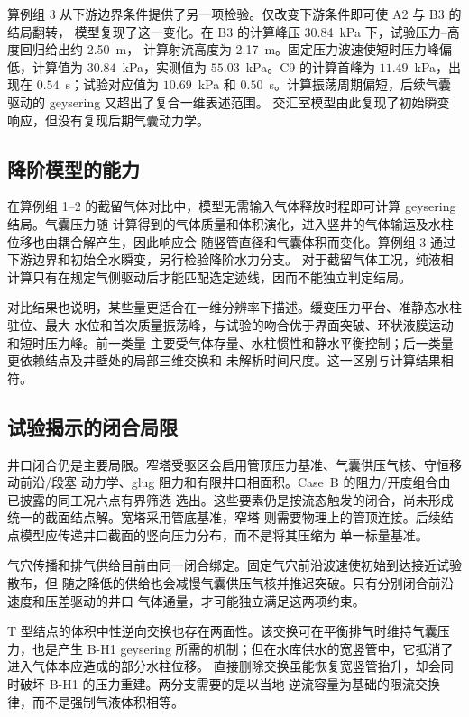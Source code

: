 算例组 3 从下游边界条件提供了另一项检验。仅改变下游条件即可使 A2 与 B3 的结局翻转，
模型复现了这一变化。在 B3 的计算峰压 30.84~kPa 下，试验压力--高度回归给出约 2.50~m，
计算射流高度为 2.17~m。固定压力波速使短时压力峰偏低，计算值为 $30.84$~kPa，实测值为
$55.03$~kPa。C9 的计算首峰为 $11.49$~kPa，出现在 $0.54$~s；试验对应值为
$10.69$~kPa 和 $0.50$~s。计算振荡周期偏短，后续气囊驱动的 geysering 又超出了复合一维表述范围。
交汇室模型由此复现了初始瞬变响应，但没有复现后期气囊动力学。

\subsection{降阶模型的能力}

在算例组 1--2 的截留气体对比中，模型无需输入气体释放时程即可计算 geysering 结局。气囊压力随
计算得到的气体质量和体积演化，进入竖井的气体输运及水柱位移也由耦合解产生，因此响应会
随竖管直径和气囊体积而变化。算例组 3 通过下游边界和初始全水瞬变，另行检验降阶水力分支。
对于截留气体工况，纯液相计算只有在规定气侧驱动后才能匹配选定迹线，因而不能独立判定结局。

对比结果也说明，某些量更适合在一维分辨率下描述。缓变压力平台、准静态水柱驻位、最大
水位和首次质量振荡峰，与试验的吻合优于界面突破、环状液膜运动和短时压力峰。前一类量
主要受气体存量、水柱惯性和静水平衡控制；后一类量更依赖结点及井壁处的局部三维交换和
未解析时间尺度。这一区别与计算结果相符。

\subsection{试验揭示的闭合局限}

井口闭合仍是主要局限。窄塔受驱区会启用管顶压力基准、气囊供压气核、守恒移动前沿/段塞
动力学、glug 阻力和有限井口相面积。Case~B 的阻力/开度组合由已披露的同工况六点有界筛选
选出。这些要素仍是按流态触发的闭合，尚未形成统一的截面结点解。宽塔采用管底基准，窄塔
则需要物理上的管顶连接。后续结点模型应传递井口截面的竖向压力分布，而不是将其压缩为
单一标量基准。

气穴传播和排气供给目前由同一闭合绑定。固定气穴前沿波速使初始到达接近试验散布，但
随之降低的供给也会减慢气囊供压气核并推迟突破。只有分别闭合前沿速度和压差驱动的井口
气体通量，才可能独立满足这两项约束。

T 型结点的体积中性逆向交换也存在两面性。该交换可在平衡排气时维持气囊压力，也是产生
B-H1 geysering 所需的机制；但在水库供水的宽竖管中，它抵消了进入气体本应造成的部分水柱位移。
直接删除交换虽能恢复宽竖管抬升，却会同时破坏 B-H1 的压力重建。两分支需要的是以当地
逆流容量为基础的限流交换律，而不是强制气液体积相等。

